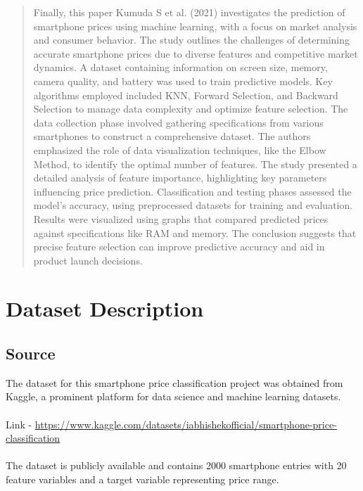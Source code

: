 \documentclass[12pt]{report}
\begin{document}
\begin{quotation}
  Finally, this paper Kumuda S et al. \cite{kumuda2021} (2021) investigates the prediction of smartphone prices using machine learning, with a focus on market analysis and consumer behavior. The study outlines the challenges of determining accurate smartphone prices due to diverse features and competitive market dynamics. A dataset containing information on screen size, memory, camera quality, and battery was used to train predictive models. Key algorithms employed included KNN, Forward Selection, and Backward Selection to manage data complexity and optimize feature selection. The data collection phase involved gathering specifications from various smartphones to construct a comprehensive dataset. The authors emphasized the role of data visualization techniques, like the Elbow Method, to identify the optimal number of features. The study presented a detailed analysis of feature importance, highlighting key parameters influencing price prediction. Classification and testing phases assessed the model's accuracy, using preprocessed datasets for training and evaluation. Results were visualized using graphs that compared predicted prices against specifications like RAM and memory. The conclusion suggests that precise feature selection can improve predictive accuracy and aid in product launch decisions.
\end{quotation}


\chapter{Dataset Description}
\section{Source}
The dataset for this smartphone price classification project was obtained from Kaggle, a prominent platform for data science and machine learning datasets.\\ \\
Link - \href{https://www.kaggle.com/datasets/iabhishekofficial/mobile-price-classification?select=train.csv}{https://www.kaggle.com/datasets/iabhishekofficial/smartphone-price-classification}\\ \\
The dataset is publicly available and contains 2000 smartphone entries with 20 feature variables and a target variable representing price range.
\end{document}
